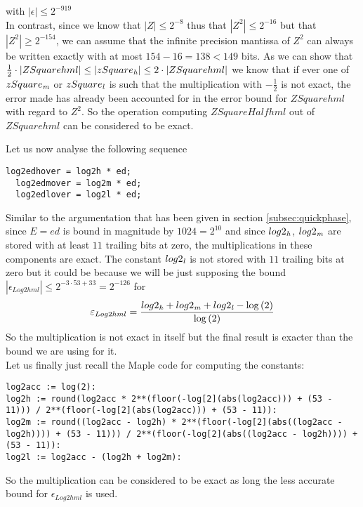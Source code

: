 with
$\left \vert \epsilon \right \vert \leq 2^{-919}$ \\
In contrast, since we know that $\left \vert Z \right \vert \leq 2^{-8}$
thus that $\left \vert Z^2 \right \vert \leq 2^{-16}$ but that $\left \vert Z^2 \right \vert \geq 2^{-154}$, we can
assume that the infinite precision mantissa of $Z^2$ can always be written exactly with at most $154 - 16 = 138 < 149$ 
bits. As we can show that 
$\frac{1}{2} \cdot \left \vert ZSquarehml \right \vert \leq \left \vert zSquare_{\mathit{h}} \right \vert \leq 
2 \cdot \left \vert ZSquarehml \right \vert$ we know that if ever one of $zSquare_{\mathit{m}}$ or $zSquare_{\mathit{l}}$ is such that
the multiplication with $-\frac{1}{2}$ is not exact, the error made has already been accounted for in the error bound
for $ZSquarehml$ with regard to $Z^2$.
So the operation computing $ZSquareHalfhml$ out of $ZSquarehml$ can be considered to be exact. \par
Let us now analyse the following sequence 
\begin{lstlisting}[caption={Multiplication of triple-double $Log2hml$ by $E$},firstnumber=126]
  log2edhover = log2h * ed;
  log2edmover = log2m * ed;
  log2edlover = log2l * ed;
\end{lstlisting}
Similar to the argumentation that has been given in section \ref{subsec:quickphase}, since $E=ed$ is bound
in magnitude by $1024=2^{10}$ and since $log2_{\mathit{h}}$, $log2_{\mathit{m}}$ are stored with at least $11$ trailing bits at zero,
the multiplications in these components are exact. The constant $log2_{\mathit{l}}$ is not stored with $11$ trailing bits at zero
but it could be because we will be just supposing the bound $\left \vert \epsilon_{Log2hml} \right \vert \leq 2^{-3 \cdot 53 + 33} = 2^{-126}$ for
$$\varepsilon_{Log2hml} = \frac{log2_{\mathit{h}} + log2_{\mathit{m}} + log2_{\mathit{l}} - \log\left( 2 \right)}{\log\left( 2 \right)}$$
So the multiplication is not exact in itself but the final result is exacter than the bound we are using for it.\\
Let us finally just recall the Maple code for computing the constants:
\begin{lstlisting}[caption={Maple code for computing $Log2hml$},firstnumber=21]
log2acc := log(2):
log2h := round(log2acc * 2**(floor(-log[2](abs(log2acc))) + (53 - 11))) / 2**(floor(-log[2](abs(log2acc))) + (53 - 11)):
log2m := round((log2acc - log2h) * 2**(floor(-log[2](abs((log2acc - log2h)))) + (53 - 11))) / 2**(floor(-log[2](abs((log2acc - log2h)))) + (53 - 11)):
log2l := log2acc - (log2h + log2m):
\end{lstlisting}
So the multiplication can be considered to be exact as long the less accurate bound for $\epsilon_{Log2hml}$ is used. \\ ~ \\
